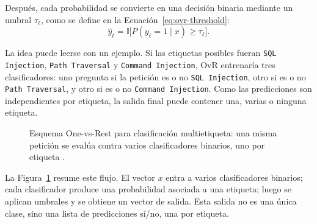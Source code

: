 \documentclass[12pt,oneside]{report}
\newcommand{\ind}{\mathbb{I}} %
\begin{document}
Después, cada probabilidad se convierte en una decisión binaria mediante un umbral $\tau_\ell$, como se define en la Ecuación~\eqref{eq:ovr-threshold}:
\begin{equation}
\label{eq:ovr-threshold}
\hat{y}_{\ell}=\ind\big[P(y_\ell=1\mid x)\ge \tau_\ell\big].
\end{equation}

La idea puede leerse con un ejemplo. Si las etiquetas posibles fueran \texttt{SQL Injection}, \texttt{Path Traversal} y \texttt{Command Injection}, OvR entrenaría tres clasificadores: uno pregunta si la petición es o no \texttt{SQL Injection}, otro si es o no \texttt{Path Traversal}, y otro si es o no \texttt{Command Injection}. Como las predicciones son independientes por etiqueta, la salida final puede contener una, varias o ninguna etiqueta.

\begin{figure}[H]
\centering
{}
\caption{Esquema One-vs-Rest para clasificación multietiqueta: una misma petición se evalúa contra varios clasificadores binarios, uno por etiqueta \cite{tsoumakas_multilabel_overview,rifkin_ova}.}
\label{fig:ovr}
\end{figure}

La Figura~\ref{fig:ovr} resume este flujo. El vector $x$ entra a varios clasificadores binarios; cada clasificador produce una probabilidad asociada a una etiqueta; luego se aplican umbrales y se obtiene un vector de salida. Esta salida no es una única clase, sino una lista de predicciones sí/no, una por etiqueta.
\end{document}
